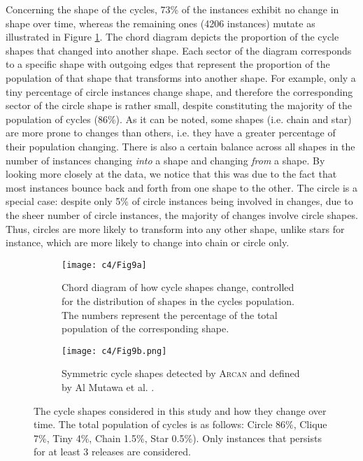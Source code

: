 Concerning the shape of the cycles, 73\% of the instances exhibit no change in shape over time, whereas the remaining ones (4206 instances) mutate as illustrated in Figure \ref{c4:fig:chord-shapes}.
The chord diagram depicts the proportion of the cycle shapes that changed into another shape. Each sector of the diagram corresponds to a specific shape with outgoing edges that represent the proportion of the population of that shape that transforms into another shape. For example, only a tiny percentage of circle instances change shape, and therefore the corresponding sector of the circle shape is rather small, despite constituting the majority of the population of cycles (86\%).
As it can be noted, some shapes (i.e. chain and star) are more prone to changes than others, i.e. they have a greater percentage of their population changing.
There is also a certain balance across all shapes in the number of instances changing \emph{into} a shape and changing \emph{from} a shape. By looking more closely at the data, we notice that this was due to the fact that most instances bounce back and forth from one shape to the other.
The circle is a special case: despite only 5\% of circle instances being involved in changes, due to the sheer number of circle instances, the majority of changes involve circle shapes. Thus, circles are more likely to transform into any other shape, unlike stars for instance, which are more likely to change into chain or circle only.

\begin{figure}
    \begin{subfigure}[t]{0.65\textwidth}
        \centering
        \texttt{[image: c4/Fig9a]}
        \caption{Chord diagram of how cycle shapes change, controlled for the distribution of shapes in the cycles population. The numbers represent the percentage of the total population of the corresponding shape.}\label{c4:fig:chord-shapes}
    \end{subfigure}
    \hfill
    \begin{subfigure}[t]{0.3\textwidth}
        \centering
        \texttt{[image: c4/Fig9b.png]}
        \caption{Symmetric cycle shapes detected by \textsc{Arcan} and defined by Al Mutawa et al. \cite{AlMutawa2014}.}\label{c4:fig:cycle-shapes}
    \end{subfigure}
    \caption{The cycle shapes considered in this study and how they change over time. The total  population of cycles is as follows: Circle 86\%, Clique 7\%, Tiny 4\%, Chain 1.5\%, Star 0.5\%). Only instances that persists for at least 3 releases are considered.}
\end{figure}

